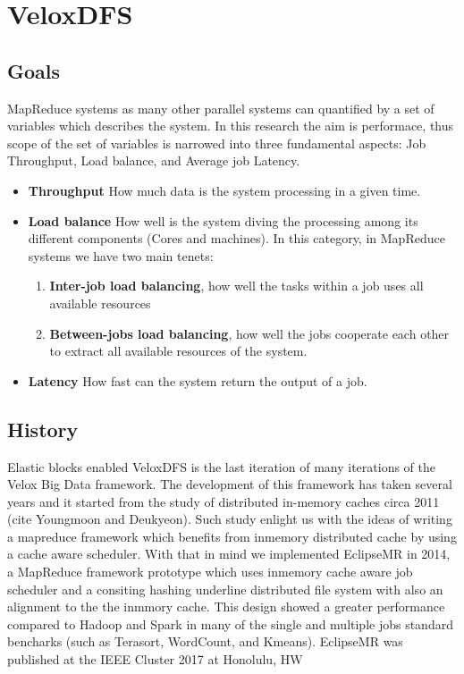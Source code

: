 \section{VeloxDFS}
\subsection{Goals}
MapReduce systems as many other parallel systems can quantified by a set of variables which describes the system. In this research the aim is performace, thus scope of the set of variables is narrowed into three fundamental aspects: Job Throughput, Load balance, and Average job Latency. 

 \begin{itemize}
     \item \textbf{Throughput} How much data is the system processing in a given time.
     \item \textbf{Load balance} How well is the system diving the processing among its different components (Cores and machines). In this category, in MapReduce systems we have two main tenets:
     \begin{enumerate}
         \item \textbf{Inter-job load balancing}, how well the tasks within a job uses all available resources
         \item \textbf{Between-jobs load balancing}, how well the jobs cooperate each other to extract all available resources of the system.
     \end{enumerate}
     \item \textbf{Latency} How fast can the system return the output of a job.
 \end{itemize}
 
\subsection{History}
Elastic blocks enabled VeloxDFS is the last iteration of many iterations of the Velox Big Data framework. The development of this framework has taken several years and it started from the study of distributed in-memory caches circa 2011 (cite Youngmoon and Deukyeon). Such study enlight us with the ideas of writing a mapreduce framework which benefits from inmemory distributed cache by using a cache aware scheduler. With that in mind we implemented EclipseMR in 2014, a MapReduce framework prototype which uses inmemory cache aware job scheduler and a consiting hashing underline distributed file system with also an alignment to the the inmmory cache. This design showed a greater performance compared to Hadoop and Spark in many of the single and multiple jobs standard bencharks (such as Terasort, WordCount, and Kmeans). EclipseMR was published at the IEEE Cluster 2017 at Honolulu, HW\\\\

